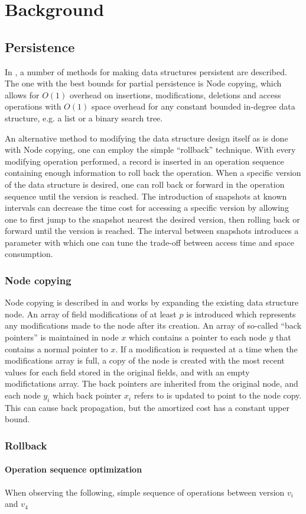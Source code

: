 \chapter{Background}

\section{Persistence}
In \cite{Driscoll198986}, a number of methods for making data structures
persistent are described. The one with the best bounds for partial persistence
is Node copying, which allows for $O(1)$ overhead on insertions, modifications,
deletions and access operations with $O(1)$ space overhead for any
constant bounded in-degree data structure, e.g. a list or a binary search tree.

An alternative method to modifying the data structure design itself as is done
with Node copying, one can employ the simple ``rollback'' technique. With every
modifying operation performed, a record is inserted in an operation sequence
containing enough information to roll back the operation. When a specific
version of the data structure is desired, one can roll back or forward in the
operation sequence until the version is reached. The introduction of snapshots
at known intervals can decrease the time cost for accessing a specific version
by allowing one to first jump to the snapshot nearest the desired version, then
rolling back or forward until the version is reached. The interval between
snapshots introduces a parameter with which one can tune the trade-off between
access time and space consumption.

\subsection{Node copying}
Node copying is described in \cite{Driscoll198986} and works by expanding the
existing data structure node. An array of field modifications of at least $p$ is
introduced which represents any modifications made to the node after its
creation. An array of so-called ``back pointers'' is maintained in node $x$
which contains a pointer to each node $y$ that contains a normal pointer to $x$.
If a modification is requested at a time when the modifications array is full, a
copy of the node is created with the most recent values for each field stored in
the original fields, and with an empty modifictations array. The back pointers
are inherited from the original node, and each node $y_i$ which back pointer
$x_i$ refers to is updated to point to the node copy. This can cause back
propagation, but the amortized cost has a constant upper bound.

\subsection{Rollback}
\subsubsection{Operation sequence optimization}
When observing the following, simple sequence of operations between version
$v_i$ and $v_4$
